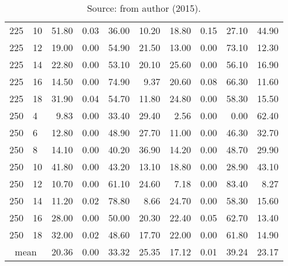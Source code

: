 \begin{table*}[h]
\begin{center}
\begin{tabular} {l l | r r r r | r r r r }
225  &             10  &  51.80  &            0.03             &               36.00  &  10.20  &  18.80  &            0.15             &               27.10  &  44.90  \\
225  &             12  &  19.00  &            0.00             &               54.90  &  21.50  &  13.00  &            0.00             &               73.10  &  12.30  \\
225  &             14  &  22.80  &            0.00             &               53.10  &  20.10  &  25.60  &            0.00             &               56.10  &  16.90  \\
225  &             16  &  14.50  &            0.00             &               74.90  &  9.37   &  20.60  &            0.08             &               66.30  &  11.60  \\
225  &             18  &  31.90  &            0.04             &               54.70  &  11.80  &  24.80  &            0.00             &               58.30  &  15.50  \\
250  &             4   &  9.83   &            0.00             &               33.40  &  29.40  &  2.56   &            0.00             &               0.00   &  62.40  \\
250  &             6   &  12.80  &            0.00             &               48.90  &  27.70  &  11.00  &            0.00             &               46.30  &  32.70  \\
250  &             8   &  14.10  &            0.00             &               40.20  &  36.90  &  14.20  &            0.00             &               48.70  &  29.90  \\
250  &             10  &  41.80  &            0.00             &               43.20  &  13.10  &  18.80  &            0.00             &               28.90  &  43.10  \\
250  &             12  &  10.70  &            0.00             &               61.10  &  24.60  &  7.18   &            0.00             &               83.40  &  8.27   \\
250  &             14  &  11.20  &            0.02             &               78.80  &  8.66   &  24.70  &            0.00             &               58.30  &  15.60  \\
250  &             16  &  28.00  &            0.00             &               50.00  &  20.30  &  22.40  &            0.05             &               62.70  &  13.40  \\
250  &             18  &  32.00  &            0.02             &               48.60  &  17.70  &  22.00  &            0.00             &               61.80  &  14.90  \\
\hline
\multicolumn{2}{c|}{mean} &  20.36  &            0.00             &               33.32  &  25.35  &  17.12  &            0.01             &               39.24  &  23.17  \\
\hline
\end{tabular}\caption*{Source: from author (2015).} 
\end{center}
\end{table*}

